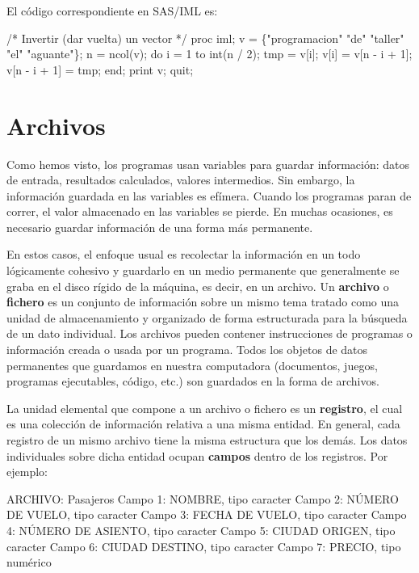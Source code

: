 \documentclass[
]{book}
\newenvironment{Shaded}{\begin{snugshade}}{\end{snugshade}}
\newcommand{\NormalTok}[1]{#1}
\begin{document}
El código correspondiente en SAS/IML es:

\begin{Shaded}
\begin{Highlighting}[]
\NormalTok{/* Invertir (dar vuelta) un vector */}
\NormalTok{proc iml;}
\NormalTok{    v = \{"programacion" "de" "taller" "el" "aguante"\};}
\NormalTok{    n = ncol(v);}
\NormalTok{    do i = 1 to int(n / 2);}
\NormalTok{        tmp = v[i];}
\NormalTok{        v[i] = v[n {-} i + 1];}
\NormalTok{        v[n {-} i + 1] = tmp;}
\NormalTok{    end;}
\NormalTok{    print v;}
\NormalTok{quit;}
\end{Highlighting}
\end{Shaded}

\hypertarget{archivos}{%
\chapter{Archivos}\label{archivos}}

Como hemos visto, los programas usan variables para guardar información: datos de entrada, resultados calculados, valores intermedios. Sin embargo, la información guardada en las variables es efímera. Cuando los programas paran de correr, el valor almacenado en las variables se pierde. En muchas ocasiones, es necesario guardar información de una forma más permanente.

En estos casos, el enfoque usual es recolectar la información en un todo lógicamente cohesivo y guardarlo en un medio permanente que generalmente se graba en el disco rígido de la máquina, es decir, en un archivo. Un \textbf{archivo} o \textbf{fichero} es un conjunto de información sobre un mismo tema tratado como una unidad de almacenamiento y organizado de forma estructurada para la búsqueda de un dato individual. Los archivos pueden contener instrucciones de programas o información creada o usada por un programa. Todos los objetos de datos permanentes que guardamos en nuestra computadora (documentos, juegos, programas ejecutables, código, etc.) son guardados en la forma de archivos.

La unidad elemental que compone a un archivo o fichero es un \textbf{registro}, el cual es una colección de información relativa a una misma entidad. En general, cada registro de un mismo archivo tiene la misma estructura que los demás. Los datos individuales sobre dicha entidad ocupan \textbf{campos} dentro de los registros. Por ejemplo:

\begin{Shaded}
\begin{Highlighting}[]
\NormalTok{ARCHIVO: Pasajeros}
\NormalTok{Campo 1: NOMBRE, tipo caracter}
\NormalTok{Campo 2: NÚMERO DE VUELO, tipo caracter}
\NormalTok{Campo 3: FECHA DE VUELO, tipo caracter}
\NormalTok{Campo 4: NÚMERO DE ASIENTO, tipo caracter}
\NormalTok{Campo 5: CIUDAD ORIGEN, tipo caracter}
\NormalTok{Campo 6: CIUDAD DESTINO, tipo caracter}
\NormalTok{Campo 7: PRECIO, tipo numérico}
\end{Highlighting}
\end{Shaded}
\end{document}
